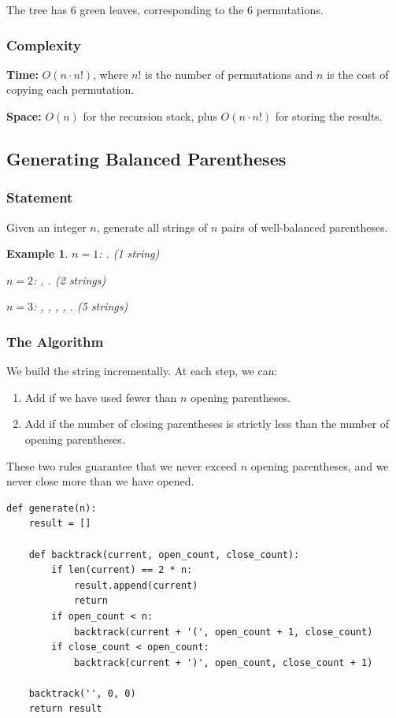 \documentclass[11pt,a4paper]{article}
\newtheorem{example}[theorem]{Example}
\newcommand{\code}[1]{\texttt{\detokenize{#1}}}
\begin{document}
The tree has 6 green leaves, corresponding to the 6 permutations.

\subsubsection{Complexity}

\textbf{Time:} $O(n \cdot n!)$, where $n!$ is the number of permutations and $n$ is the cost of copying each permutation.

\textbf{Space:} $O(n)$ for the recursion stack, plus $O(n \cdot n!)$ for storing the results.

\subsection{Generating Balanced Parentheses}

\subsubsection{Statement}

Given an integer $n$, generate all strings of $n$ pairs of well-balanced parentheses.

\begin{example}
$n = 1$: \code{()}. (1 string)

$n = 2$: \code{(())}, \code{()()}. (2 strings)

$n = 3$: \code{((()))}, \code{(()())}, \code{(())()}, \code{()(())}, \code{()()()}. (5 strings)
\end{example}

\subsubsection{The Algorithm}

We build the string incrementally. At each step, we can:
\begin{enumerate}
    \item Add \code{(} if we have used fewer than $n$ opening parentheses.
    \item Add \code{)} if the number of closing parentheses is strictly less than the number of opening parentheses.
\end{enumerate}

These two rules guarantee that we never exceed $n$ opening parentheses, and we never close more than we have opened.

\begin{lstlisting}
def generate(n):
    result = []

    def backtrack(current, open_count, close_count):
        if len(current) == 2 * n:
            result.append(current)
            return
        if open_count < n:
            backtrack(current + '(', open_count + 1, close_count)
        if close_count < open_count:
            backtrack(current + ')', open_count, close_count + 1)

    backtrack('', 0, 0)
    return result
\end{lstlisting}
\end{document}
